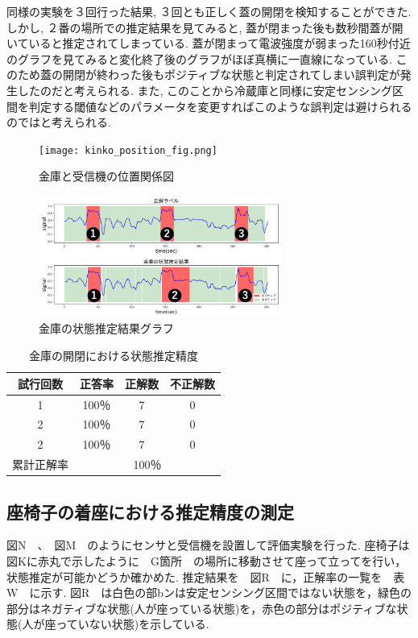 \documentclass[Japanese]{dicomopapers}
\begin{document}
同様の実験を３回行った結果, ３回とも正しく蓋の開閉を検知することができた.
しかし, ２番の場所での推定結果を見てみると, 蓋が閉まった後も数秒間蓋が開いていると推定されてしまっている.
蓋が閉まって電波強度が弱まった160秒付近のグラフを見てみると変化終了後のグラフがほぼ真横に一直線になっている.
このため蓋の開閉が終わった後もポジティブな状態と判定されてしまい誤判定が発生したのだと考えられる.
また, このことから冷蔵庫と同様に安定センシング区間を判定する閾値などのパラメータを変更すればこのような誤判定は避けられるのではと考えられる.

\begin{figure}[ht]
    \centering
    \texttt{[image: kinko\_position\_fig.png]}
    \caption{金庫と受信機の位置関係図}
    \label{kinko_position}
\end{figure}

\begin{figure}[ht]
    \centering
    \includegraphics[width=8cm]{kinko_graph.png}
    \caption{金庫の状態推定結果グラフ}
    \label{kinko_graph}
\end{figure}

\begin{table}[htb]
    \begin{center}
        \caption{金庫の開閉における状態推定精度}
        \label{kinko_fig}
        \begin{tabular}{|c|c|c|c|} \hline
        試行回数 & 正答率 & 正解数 & 不正解数 \\ \hline
        1 & 100％ & 7 & 0 \\ \hline
        2 & 100％ & 7 & 0 \\ \hline
        2 & 100％ & 7 & 0 \\ \hline \hline
        累計正解率 & \multicolumn{3}{c|}{100％} \\ \hline
        \end{tabular}
    \end{center}
\end{table}

\subsection{座椅子の着座における推定精度の測定}
図N　、　図M　のようにセンサと受信機を設置して評価実験を行った.
座椅子は図Kに赤丸で示したように　G箇所　の場所に移動させて座って立ってを行い，状態推定が可能かどうか確かめた.
推定結果を　図R　に，正解率の一覧を　表W　に示す.
図R　は白色の部bンは安定センシング区間ではない状態を，緑色の部分はネガティブな状態(人が座っている状態)を，赤色の部分はポジティブな状態(人が座っていない状態)を示している.
\end{document}
